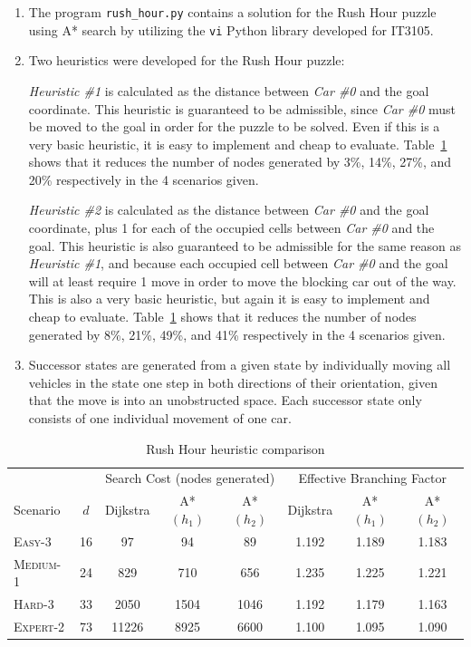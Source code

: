 \begin{enumerate}[label=B.\arabic*:]
\item The program \texttt{rush\_hour.py} contains a solution for the Rush Hour puzzle using A* search by utilizing the \texttt{vi} Python library developed for IT3105.
\item Two heuristics were developed for the Rush Hour puzzle:

\textit{Heuristic \#1} is calculated as the distance between \textit{Car \#0} and the goal coordinate. This heuristic is guaranteed to be admissible, since \textit{Car \#0} must be moved to the goal in order for the puzzle to be solved. Even if this is a very basic heuristic, it is easy to implement and cheap to evaluate. Table~\ref{table:rush_hour_heuristics} shows that it reduces the number of nodes generated by 3\%, 14\%, 27\%, and 20\% respectively in the 4 scenarios given.

\textit{Heuristic \#2} is calculated as the distance between \textit{Car \#0} and the goal coordinate, plus 1 for each of the occupied cells between \textit{Car \#0} and the goal. This heuristic is also guaranteed to be admissible for the same reason as \textit{Heuristic \#1}, and because each occupied cell between \textit{Car \#0} and the goal will at least require 1 move in order to move the blocking car out of the way. This is also a very basic heuristic, but again it is easy to implement and cheap to evaluate. Table~\ref{table:rush_hour_heuristics} shows that it reduces the number of nodes generated by 8\%, 21\%, 49\%, and 41\% respectively in the 4 scenarios given.

\item Successor states are generated from a given state by individually moving all vehicles in the state one step in both directions of their orientation, given that the move is into an unobstructed space. Each successor state only consists of one individual movement of one car.
\end{enumerate}

\begin{table}
\centering
\begin{tabular}{lccccccc}
\toprule
& & \multicolumn{3}{c}{Search Cost (nodes generated)} & \multicolumn{3}{c}{Effective Branching Factor} \\
Scenario & $d$ & Dijkstra & A*$(h_1)$ & A*$(h_2)$ & Dijkstra & A*$(h_1)$ & A*$(h_2)$ \\
\midrule
\textsc{Easy-3}   & 16 &    97 &   94 &   89 & 1.192 & 1.189 & 1.183 \\
\textsc{Medium-1} & 24 &   829 &  710 &  656 & 1.235 & 1.225 & 1.221 \\
\textsc{Hard-3}   & 33 &  2050 & 1504 & 1046 & 1.192 & 1.179 & 1.163 \\
\textsc{Expert-2} & 73 & 11226 & 8925 & 6600 & 1.100 & 1.095 & 1.090 \\
\bottomrule
\end{tabular}
\caption{Rush Hour heuristic comparison}
\label{table:rush_hour_heuristics}
\end{table}

